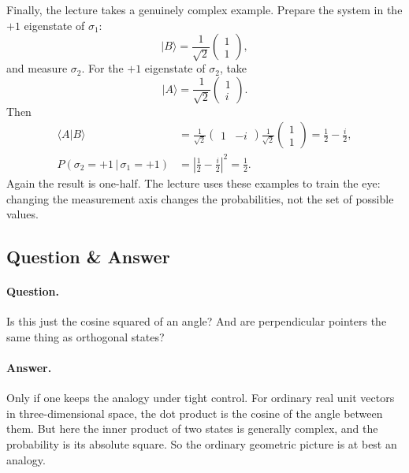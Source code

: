 Finally, the lecture takes a genuinely complex example. Prepare the system in the \(+1\) eigenstate of \(\sigma_1\):
\begin{equation}
|B\rangle=
\frac{1}{\sqrt{2}}
\begin{pmatrix}
1\\
1
\end{pmatrix},
\end{equation}
and measure \(\sigma_2\). For the \(+1\) eigenstate of \(\sigma_2\), take
\begin{equation}
|A\rangle=
\frac{1}{\sqrt{2}}
\begin{pmatrix}
1\\
i
\end{pmatrix}.
\end{equation}
Then
\begin{align}
\langle A|B\rangle
&=
\frac{1}{\sqrt{2}}
\begin{pmatrix}
1 & -i
\end{pmatrix}
\frac{1}{\sqrt{2}}
\begin{pmatrix}
1\\
1
\end{pmatrix}
=
\frac{1}{2}-\frac{i}{2},\\
P(\sigma_2=+1\,|\,\sigma_1=+1)
&=
\left|\frac{1}{2}-\frac{i}{2}\right|^2
=
\frac{1}{2}.
\end{align}
Again the result is one-half. The lecture uses these examples to train the eye: changing the measurement axis changes the probabilities, not the set of possible values.

\subsection{Question \& Answer}

\paragraph{Question.} Is this just the cosine squared of an angle? And are perpendicular pointers the same thing as orthogonal states?

\paragraph{Answer.} Only if one keeps the analogy under tight control. For ordinary real unit vectors in three-dimensional space, the dot product is the cosine of the angle between them. But here the inner product of two states is generally complex, and the probability is its absolute square. So the ordinary geometric picture is at best an analogy.

